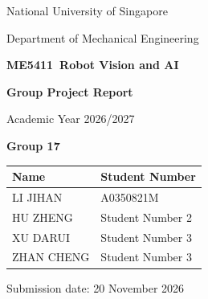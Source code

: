 \documentclass[11pt,a4paper]{article}
\newcommand{\CourseCode}{ME5411}
\newcommand{\CourseTitle}{Robot Vision and AI}
\newcommand{\ProjectTitle}{Group Project Report}
\newcommand{\AcademicYear}{Academic Year 2026/2027}
\newcommand{\GroupNumber}{17}
\newcommand{\SubmissionDate}{20 November 2026}
\newcommand{\GroupMembers}{%
  LI JIHAN & A0350821M \\
  HU ZHENG & Student Number 2 \\
  XU DARUI & Student Number 3 \\
  ZHAN CHENG  & Student Number 3 \\
}
\numberwithin{figure}{section}
\numberwithin{table}{section}
\numberwithin{equation}{section}
\begin{document}
\hypersetup{pageanchor=false}

\begin{titlepage}
  \thispagestyle{empty}
  \centering

  \vspace*{18mm}
  {\Large National University of Singapore\par}
  \vspace{5mm}
  {\Large Department of Mechanical Engineering\par}

  \vfill
  {\LARGE\bfseries \CourseCode\ \CourseTitle\par}
  \vspace{8mm}
  {\Huge\bfseries \ProjectTitle\par}
  \vspace{6mm}
  {\Large \AcademicYear\par}

  \vfill
  {\Large\bfseries Group \GroupNumber\par}
  \vspace{8mm}

  \renewcommand{\arraystretch}{1.35}
  \begin{tabular}{>{\raggedright\arraybackslash}p{65mm}
                  >{\raggedright\arraybackslash}p{52mm}}
    \toprule
    \textbf{Name} & \textbf{Student Number} \\
    \midrule
    \GroupMembers
    \bottomrule
  \end{tabular}

  \vfill
  {\large Submission date: \SubmissionDate\par}
\end{titlepage}

\hypersetup{pageanchor=true}
\setcounter{page}{1}
\tableofcontents
\clearpage
\listoffigures
\listoftables

\clearpage
{}
\setcounter{page}{1}
\end{document}
